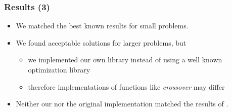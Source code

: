 \begin{frame}
	\frametitle{Results (3)}
\begin{itemize}

	\item 	We matched the best known results for small problems.

	\item 	We found acceptable solutions for larger problems, but
		\begin{itemize}
			\item 		we implemented our own library instead of using a well known optimization library
			\item 		therefore implementations of functions like \emph{crossover} may differ
		\end{itemize}
		

	\item 	Neither our nor the original implementation matched the results of \cite[PSO'08]{PSO}.
\end{itemize}

	
\end{frame}


